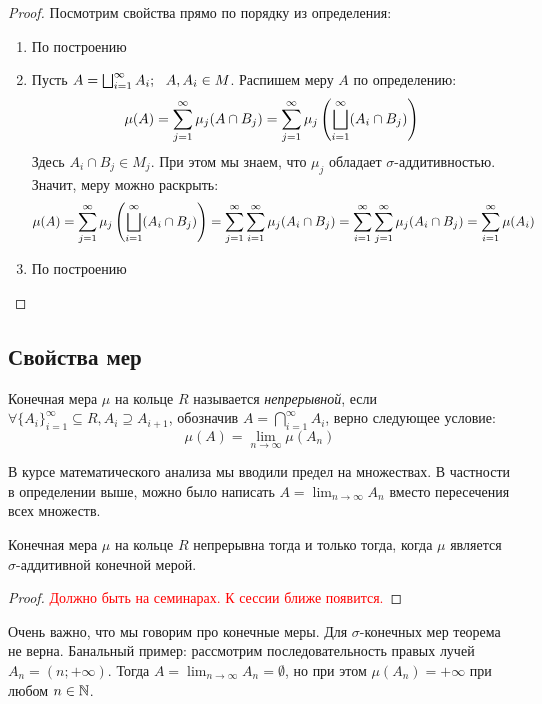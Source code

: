 \begin{proof}
	Посмотрим свойства прямо по порядку из определения:
	\begin{enumerate}
		\item По построению
		
		\item Пусть $A = \bscup_{i = 1}^\infty A_i;\ \ A, A_i \in M$. Распишем меру $A$ по определению:
		\[
			\mu(A) = \sum_{j = 1}^\infty \mu_j(A \cap B_j) = \sum_{j = 1}^\infty \mu_j\left(\bigsqcup_{i = 1}^\infty (A_i \cap B_j)\right)
		\]
		Здесь $A_i \cap B_j \in M_j$. При этом мы знаем, что $\mu_j$ обладает $\sigma$-аддитивностью. Значит, меру можно раскрыть:
		\[
			\mu(A) = \sum_{j = 1}^\infty \mu_j\left(\bigsqcup_{i = 1}^\infty (A_i \cap B_j)\right) = \sum_{j = 1}^\infty \sum_{i = 1}^\infty \mu_j(A_i \cap B_j) = \sum_{i = 1}^\infty \sum_{j = 1}^\infty \mu_j(A_i \cap B_j) = \sum_{i = 1}^\infty \mu(A_i)
		\]
		
		\item По построению
	\end{enumerate}
\end{proof}

\subsection*{Свойства мер}

\begin{definition}
	Конечная мера $\mu$ на кольце $R$ называется \textit{непрерывной}, если $\forall \{A_i\}_{i = 1}^\infty \subseteq R, A_i \supseteq A_{i + 1}$, обозначив $A = \bigcap_{i = 1}^\infty A_i$, верно следующее условие:
	\[
		\mu(A) = \lim_{n \to \infty} \mu(A_n)
	\]
\end{definition}

\begin{note}
	В курсе математического анализа мы вводили предел на множествах. В частности в определении выше, можно было написать $A = \lim_{n \to \infty} A_n$ вместо пересечения всех множеств.
\end{note}

\begin{theorem}
	Конечная мера $\mu$ на кольце $R$ непрерывна тогда и только тогда, когда $\mu$ является $\sigma$-аддитивной конечной мерой.
\end{theorem}

\begin{proof}
	\textcolor{red}{Должно быть на семинарах. К сессии ближе появится.}
\end{proof}

\begin{note}
	Очень важно, что мы говорим про конечные меры. Для $\sigma$-конечных мер теорема не верна. Банальный пример: рассмотрим последовательность правых лучей $A_n = (n; +\infty)$. Тогда $A = \lim_{n \to \infty} A_n = \emptyset$, но при этом $\mu(A_n) = +\infty$ при любом $n \in \mathbb{N}$.
\end{note}